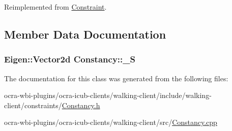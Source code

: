 \-Reimplemented from \hyperlink{classConstraint_a07453509c3f0f95034db965c9e699810}{\-Constraint}.



\subsection{\-Member \-Data \-Documentation}
\hypertarget{classConstancy_a7d416426cf6f8e9cd651d10df17c81d5}{
\subsubsection[{\-\_\-\-S}]{\setlength{\rightskip}{0pt plus 5cm}\-Eigen\-::\-Vector2d {\bf \-Constancy\-::\-\_\-\-S}}}\label{classConstancy_a7d416426cf6f8e9cd651d10df17c81d5}


\-The documentation for this class was generated from the following files\-:\begin{DoxyCompactItemize}
\item 
ocra-\/wbi-\/plugins/ocra-\/icub-\/clients/walking-\/client/include/walking-\/client/constraints/\hyperlink{Constancy_8h}{\-Constancy.\-h}\item 
ocra-\/wbi-\/plugins/ocra-\/icub-\/clients/walking-\/client/src/\hyperlink{Constancy_8cpp}{\-Constancy.\-cpp}\end{DoxyCompactItemize}
